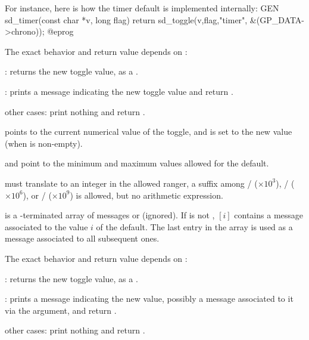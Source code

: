 For instance, here is how the timer default is implemented internally:
\bprog
GEN
sd_timer(const char *v, long flag)
{ return sd_toggle(v,flag,"timer", &(GP_DATA->chrono)); }
@eprog

The exact behavior and return value depends on :

\item {}: returns the new toggle value, as a .

\item {}: prints a message indicating the new toggle value
and return .

\item other cases: print nothing and return .



\item {} points to the current numerical value of the toggle, and is set
to the new value (when  is non-empty).

\item {} and  point to the minimum and maximum values allowed
for the default.

\item {} must translate to an integer in the allowed ranger, a suffix
among
/ ($\times 10^3$),
/ ($\times 10^6$),
or
/ ($\times 10^9$) is allowed, but no arithmetic expression.

\item {} is a \kbd[NULL]-terminated array of messages or 
(ignored). If  is not , $[i]$ contains
a message associated to the value $i$ of the default. The last entry in the
 array is used as a message associated to all subsequent ones.

The exact behavior and return value depends on :

\item {}: returns the new toggle value, as a .

\item {}: prints a message indicating the new value,
possibly a message associated to it via the  argument, and return
.

\item other cases: print nothing and return .

